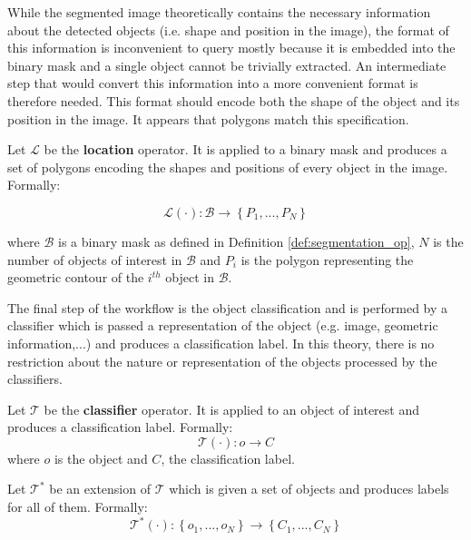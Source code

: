 While the segmented image theoretically contains the necessary information about the detected objects (i.e. shape and position in the image), the format of this information is inconvenient to query mostly because it is embedded into the binary mask and a single object cannot be trivially extracted. An intermediate step that would convert this information into a more convenient format is therefore needed. This format should encode both the shape of the object and its position in the image. It appears that polygons match this specification. 

\begin{definition} \label{def:locate_op}
Let $\mathcal{L}$ be the \textbf{location} operator. It is applied to a binary mask and produces a set of polygons encoding the shapes and positions of every object in the image. Formally:

\begin{equation}
	\mathcal{L}(\cdot) : \mathcal{B} \rightarrow \left\{P_1, ..., P_N\right\}
\end{equation}

where $\mathcal{B}$ is a binary mask as defined in Definition \ref{def:segmentation_op}, $N$ is the number of objects of interest in $\mathcal{B}$ and $P_i$ is the polygon representing the geometric contour of the $i^{th}$ object in $\mathcal{B}$.
\end{definition}

The final step of the workflow is the object classification and is performed by a classifier which is passed a representation of the object (e.g. image, geometric information,...) and produces a classification label. In this theory, there is no restriction about the nature or representation of the objects processed by the classifiers.

\begin{definition} Let $\mathcal{T}$ be the \textbf{classifier} operator. It is applied to an object of interest and produces a classification label. Formally:
\begin{equation}
	\mathcal{T}(\cdot) : o \rightarrow C
\end{equation}
where $o$ is the object and $C$, the classification label. 
\end{definition}
\begin{definition}
Let $\mathcal{T}^*$ be an extension of $\mathcal{T}$ which is given a set of objects and produces labels for all of them. Formally: 
\begin{equation}
	\mathcal{T}^*(\cdot) : \left\{o_1, ..., o_N\right\}  \rightarrow \left\{C_1, ..., C_N\right\}
\end{equation}
\end{definition}

